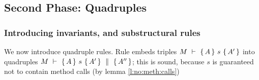 

\subsection{Second Phase: Quadruples}

\subsubsection{Introducing invariants, and substructural rules}
We now introduce  quadruple rules. %
Rule {} embeds  triples  ${M\ \vdash\ \{\,A\, \} \ s\  \{\,A'\, \} }$  into quadruples ${M\ \vdash\ \{\,A\, \} \ s\  \{\,A'\, \}\, \,\parallel\,\, \{\, A'' \, \} }$; this is sound, because $s$ is guaranteed not to contain method calls (by lemma \ref{l:no:meth:calls})

